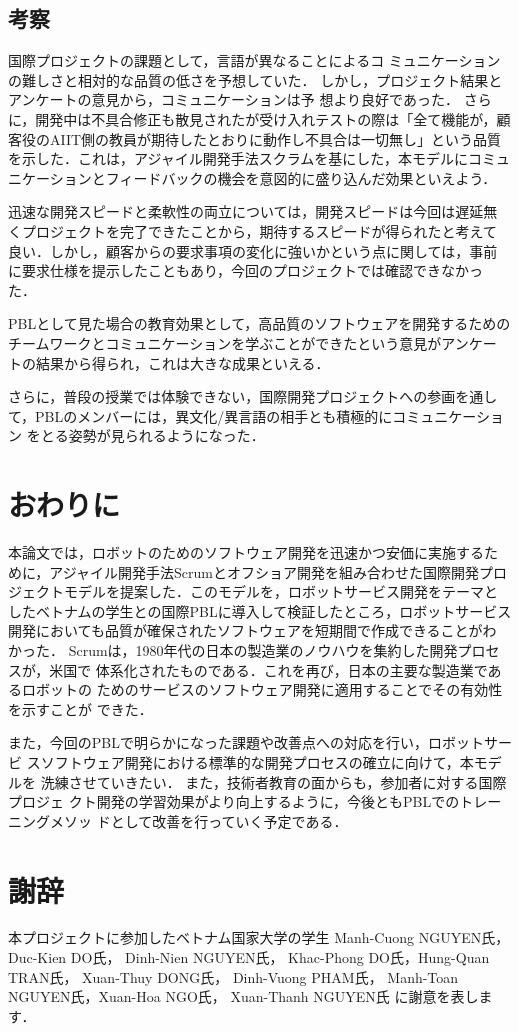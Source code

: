 \documentclass[a4j, 12Q, twocolumn, twoside]{jsarticle}
\begin{document}
\subsection{考察}

国際プロジェクトの課題として，言語が異なることによるコ
ミュニケーションの難しさと相対的な品質の低さを予想していた．
しかし，プロジェクト結果とアンケートの意見から，コミュニケーションは予
想より良好であった．
さらに，開発中は不具合修正も散見されたが受け入れテストの際は「全て機能が，顧客役のAIIT側の教員が期待したとおりに動作し不具合は一切無し」という品質を示した．これは，アジャイル開発手法スクラムを基にした，本モデルにコミュニケーションとフィードバックの機会を意図的に盛り込んだ効果といえよう．


迅速な開発スピードと柔軟性の両立については，開発スピードは今回は遅延無
くプロジェクトを完了できたことから，期待するスピードが得られたと考えて
良い．しかし，顧客からの要求事項の変化に強いかという点に関しては，事前
に要求仕様を提示したこともあり，今回のプロジェクトでは確認できなかっ
た．

PBLとして見た場合の教育効果として，高品質のソフトウェアを開発するための
チームワークとコミュニケーションを学ぶことができたという意見がアンケー
トの結果から得られ，これは大きな成果といえる．

さらに，普段の授業では体験できない，国際開発プロジェクトへの参画を通し
て，PBLのメンバーには，異文化/異言語の相手とも積極的にコミュニケーション
をとる姿勢が見られるようになった．

\section{おわりに}\label{sec:concludion}
本論文では，ロボットのためのソフトウェア開発を迅速かつ安価に実施するた
めに，アジャイル開発手法Scrumとオフショア開発を組み合わせた国際開発プロ
ジェクトモデルを提案した．このモデルを，ロボットサービス開発をテーマと
したベトナムの学生との国際PBLに導入して検証したところ，ロボットサービス
開発においても品質が確保されたソフトウェアを短期間で作成できることがわ
かった．
Scrumは，1980年代の日本の製造業のノウハウを集約した開発プロセスが，米国で
体系化されたものである．これを再び，日本の主要な製造業であるロボットの
ためのサービスのソフトウェア開発に適用することでその有効性を示すことが
できた．

また，今回のPBLで明らかになった課題や改善点への対応を行い，ロボットサービ
スソフトウェア開発における標準的な開発プロセスの確立に向けて，本モデルを
洗練させていきたい． また，技術者教育の面からも，参加者に対する国際プロジェ
クト開発の学習効果がより向上するように，今後ともPBLでのトレーニングメソッ
ドとして改善を行っていく予定である．

\section*{謝辞}
本プロジェクトに参加したベトナム国家大学の学生
Manh-Cuong NGUYEN氏， Duc-Kien DO氏， Dinh-Nien NGUYEN氏，
Khac-Phong DO氏，Hung-Quan TRAN氏， Xuan-Thuy DONG氏，
Dinh-Vuong PHAM氏， Manh-Toan NGUYEN氏，Xuan-Hoa NGO氏， Xuan-Thanh NGUYEN氏
に謝意を表します．



\end{document}
